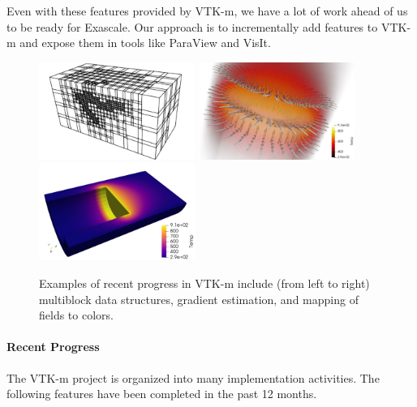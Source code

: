 Even with these features provided by VTK-m, we have a lot of work ahead of us to be ready for Exascale.
Our approach is to incrementally add features to VTK-m and expose them in tools like ParaView and VisIt.


\begin{figure}[t]
  \centering
  \includegraphics[width=2in]{projects/2.3.4-DataViz/2.3.4.13-ECP-VTK-m/VTKm-Multiblock}\quad
  \includegraphics[width=2in]{projects/2.3.4-DataViz/2.3.4.13-ECP-VTK-m/VTKm-Gradients}\quad
  \includegraphics[width=2in]{projects/2.3.4-DataViz/2.3.4.13-ECP-VTK-m/VTKm-FieldToColors}
  \caption{
    Examples of recent progress in VTK-m include (from left to right) multiblock data structures, gradient estimation, and mapping of fields to colors.
  }
  \label{fig:VTKmRecent}
\end{figure}

\paragraph{Recent Progress}
The VTK-m project is organized into many implementation activities.
The following features have been completed in the past 12 months.

